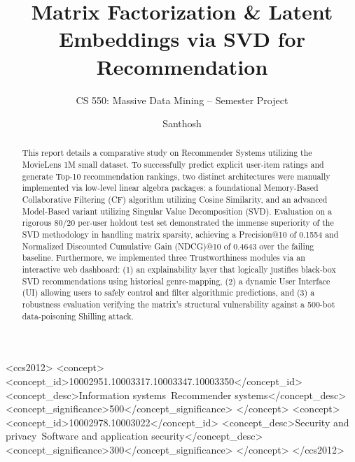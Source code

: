 \documentclass[sigconf,authordraft,nonacm]{acmart}
\begin{document}
\title{Matrix Factorization \& Latent Embeddings via SVD for Recommendation}
\subtitle{CS 550: Massive Data Mining -- Semester Project}

\author{Santhosh}

\renewcommand{\shortauthors}{Santhosh}

\begin{abstract}
This report details a comparative study on Recommender Systems utilizing the MovieLens 1M small dataset. To successfully predict explicit user-item ratings and generate Top-10 recommendation rankings, two distinct architectures were manually implemented via low-level linear algebra packages: a foundational Memory-Based Collaborative Filtering (CF) algorithm utilizing Cosine Similarity, and an advanced Model-Based variant utilizing Singular Value Decomposition (SVD). Evaluation on a rigorous 80/20 per-user holdout test set demonstrated the immense superiority of the SVD methodology in handling matrix sparsity, achieving a Precision@10 of 0.1554 and Normalized Discounted Cumulative Gain (NDCG)@10 of 0.4643 over the failing baseline. Furthermore, we implemented three Trustworthiness modules via an interactive web dashboard: (1) an explainability layer that logically justifies black-box SVD recommendations using historical genre-mapping, (2) a dynamic User Interface (UI) allowing users to safely control and filter algorithmic predictions, and (3) a robustness evaluation verifying the matrix's structural vulnerability against a 500-bot data-poisoning Shilling attack.
\end{abstract}

\begin{CCSXML}
<ccs2012>
   <concept>
       <concept_id>10002951.10003317.10003347.10003350</concept_id>
       <concept_desc>Information systems~Recommender systems</concept_desc>
       <concept_significance>500</concept_significance>
       </concept>
   <concept>
       <concept_id>10002978.10003022</concept_id>
       <concept_desc>Security and privacy~Software and application security</concept_desc>
       <concept_significance>300</concept_significance>
       </concept>
 </ccs2012>
\end{CCSXML}


\end{document}
